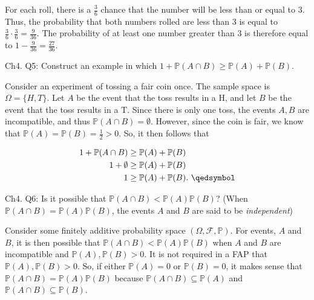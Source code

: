\documentclass[12pt]{article}
\begin{document}
\begin{center}
\begin{enumerate}[label=(\alph*)]
\noindent
For each roll, there is a $\frac{3}{6}$ chance that the number will be less than or equal to $3$. Thus, the probability that both numbers rolled are less than $3$ is equal to $\frac{3}{6} \cdot \frac{3}{6} = 	\frac{9}{36}$. The probability of at least one number greater than $3$ is therefore equal to $1-\frac{9}{36}=\frac{27}{36}$.

\end{enumerate}
\end{center}


\noindent
Ch4. Q5: Construct an example in which $1+ \mathbb{P}(A \cap B) \geq \mathbb{P}(A) + \mathbb{P}(B)$.

\vspace{.5cm}
\noindent
Consider an experiment of tossing a fair coin once. The sample space is $\Omega=\{ H, T \}$. Let $A$ be the event that the toss results in a H, and let $B$ be the event that the toss results in a T. Since there is only one toss, the events $A,B$ are incompatible, and thus $\mathbb{P}(A \cap B)=\emptyset$. However, since the coin is fair, we know that  $\mathbb{P}(A) = \mathbb{P}(B) = \frac{1}{2} > 0$. So, it then follows that 

\begin{align*}
1+ \mathbb{P}(A \cap B) & \geq \mathbb{P}(A) + \mathbb{P}(B) \\
1+ \emptyset & \geq \mathbb{P}(A) + \mathbb{P}(B) \\
1 & \geq \mathbb{P}(A) + \mathbb{P}(B). \text{     } \qedsymbol
\end{align*}


\noindent
Ch4. Q6: Is it possible that $\mathbb{P}(A \cap B) < \mathbb{P}(A)\mathbb{P}(B)$? (When $\mathbb{P}(A \cap B)=\mathbb{P}(A)\mathbb{P}(B)$, the events $A$ and $B$ are said to be \emph{independent})

\vspace{.5cm}
\noindent
Consider some finitely additive probability space $(\Omega, \mathcal{F}, \mathbb{P})$.  For events, $A$ and $B$, it is then possible that $\mathbb{P}(A \cap B) < \mathbb{P}(A)\mathbb{P}(B)$ when $A$ and $B$ are incompatible and $\mathbb{P}(A), \mathbb{P}(B) > 0$. It is not required in a FAP that $\mathbb{P}(A), \mathbb{P}(B) > 0$. So, if either $\mathbb{P}(A)=0$ or $\mathbb{P}(B)=0$,  it makes sense that $\mathbb{P}(A \cap B) = \mathbb{P}(A)\mathbb{P}(B)$ because $\mathbb{P}(A \cap B) \subseteq \mathbb{P}(A)$ and $\mathbb{P}(A \cap B) \subseteq \mathbb{P}(B)$. \\
\end{document}
